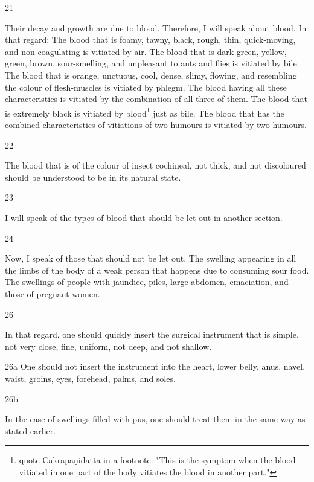 \begin{translation}
\item[21]

Their decay and growth are due to blood. Therefore, I will speak about blood. 
In that regard: The blood that is foamy, tawny, black, rough, thin, quick-moving, and non-coagulating is vitiated by air. The blood that is dark green, yellow, green, brown, sour-smelling, and unpleasant to ants and flies is vitiated by bile. The blood that is orange, unctuous, cool, dense, slimy, flowing, and resembling the colour of flesh-muscles is vitiated by phlegm. The blood having all these characteristics is vitiated by the combination of all three of them. The blood that is extremely black is vitiated by blood\footnote{\citet[64]{vulgate} quote Cakrapāṇidatta in a footnote: "This is the symptom when the blood vitiated in one part of the body vitiates the blood in another part."} just as bile. The blood that has the combined characteristics of vitiations of two humours is vitiated by two humours.

\item[22]

The blood that is of the colour of insect cochineal, not thick, and not discoloured should be understood to be in its natural state. 

\item[23]

I will speak of the types of blood that should be let out in another section. 

\item[24]

Now, I speak of those that should not be let out.
The swelling appearing in all the limbs of the body of a weak person that happens due to consuming sour food. The swellings of people with jaundice, piles, large abdomen, emaciation, and those of pregnant women.

\item[26]

In that regard, one should quickly insert the surgical instrument that is simple, not very close, fine, uniform, not deep, and not shallow. 

\item[26a] 
One should not insert the instrument into the heart, lower belly, anus, navel, waist, groins, eyes, forehead, palms, and soles.

\item[26b]

In the case of swellings filled with pus, one should treat them in the same way as stated earlier.


\end{translation}

